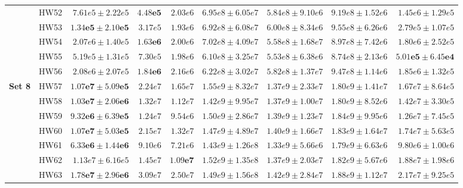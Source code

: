 \documentclass[11pt]{article}
\begin{document}
{\begin{table}
\begin{tabular}{l|r|r|r|r|r|r|r|r}
& HW52 & $7.61e5 \pm 2.22e5$ & $\mathbf{4.48e5}$ & $2.03e6$
& $6.95e8 \pm 6.05e7$ & $5.84e8 \pm 9.10e6$
& $9.19e8 \pm 1.52e6$ & $1.45e6 \pm 1.29e5$ \\

& HW53 & $\mathbf{1.34e5 \pm 2.10e5}$ & $3.17e5$ & $1.93e6$
& $6.92e8 \pm 6.08e7$ & $6.00e8 \pm 8.34e6$
& $9.55e8 \pm 6.26e6$ & $2.79e5 \pm 1.07e5$ \\

& HW54 & $2.07e6 \pm 1.40e5$ & $\mathbf{1.63e6}$ & $2.00e6$
& $7.02e8 \pm 4.09e7$ & $5.58e8 \pm 1.68e7$
& $8.97e8 \pm 7.42e6$ & $1.80e6 \pm 2.52e5$ \\

& HW55 & $5.19e5 \pm 1.31e5$ & $7.30e5$ & $1.98e6$
& $6.10e8 \pm 3.25e7$ & $5.53e8 \pm 6.38e6$
& $8.74e8 \pm 2.13e6$ & $\mathbf{5.01e5 \pm 6.45e4}$ \\

& HW56 & $2.08e6 \pm 2.07e5$ & $\mathbf{1.84e6}$ & $2.16e6$
& $6.22e8 \pm 3.02e7$ & $5.82e8 \pm 1.37e7$
& $9.47e8 \pm 1.14e6$ & $1.85e6 \pm 1.32e5$ \\
\hline

\multirow{8}{*}{\textbf{Set 8}}
& HW57 & $\mathbf{1.07e7 \pm 5.09e5}$ & $2.24e7$ & $1.65e7$
& $1.55e9 \pm 8.32e7$ & $1.37e9 \pm 2.33e7$
& $1.80e9 \pm 1.41e7$ & $1.67e7 \pm 8.64e5$ \\

& HW58 & $\mathbf{1.03e7 \pm 2.06e6}$ & $1.32e7$ & $1.12e7$
& $1.42e9 \pm 9.95e7$ & $1.37e9 \pm 1.00e7$
& $1.80e9 \pm 8.52e6$ & $1.42e7 \pm 3.30e5$ \\

& HW59 & $\mathbf{9.32e6 \pm 6.39e5}$ & $1.24e7$ & $9.54e6$
& $1.50e9 \pm 2.86e7$ & $1.39e9 \pm 1.23e7$
& $1.84e9 \pm 9.95e6$ & $1.26e7 \pm 7.45e5$ \\

& HW60 & $\mathbf{1.07e7 \pm 5.03e5}$ & $2.15e7$ & $1.32e7$
& $1.47e9 \pm 4.89e7$ & $1.40e9 \pm 1.66e7$
& $1.83e9 \pm 1.64e7$ & $1.74e7 \pm 5.63e5$ \\

& HW61 & $\mathbf{6.33e6 \pm 1.44e6}$ & $9.10e6$ & $7.21e6$
& $1.43e9 \pm 1.26e8$ & $1.33e9 \pm 5.66e6$
& $1.79e9 \pm 6.63e6$ & $9.80e6 \pm 1.00e6$ \\

& HW62 & $1.13e7 \pm 6.16e5$ & $1.45e7$ & $\mathbf{1.09e7}$
& $1.52e9 \pm 1.35e8$ & $1.37e9 \pm 2.03e7$
& $1.82e9 \pm 5.67e6$ & $1.88e7 \pm 1.98e6$ \\

& HW63 & $\mathbf{1.78e7 \pm 2.96e6}$ & $3.09e7$ & $2.50e7$
& $1.49e9 \pm 1.56e8$ & $1.42e9 \pm 2.84e7$
& $1.88e9 \pm 1.12e7$ & $2.17e7 \pm 9.25e5$ \\


\end{tabular}
\end{table}}
\end{document}
